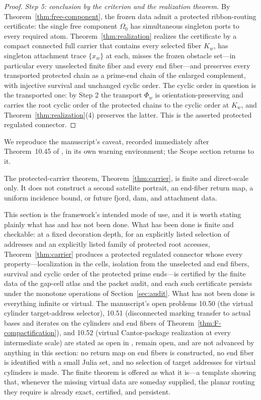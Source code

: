 \begin{proof}
\emph{Step 5: conclusion by the criterion and the realization theorem.}
By Theorem~\ref{thm:free-component}, the frozen data admit a protected
ribbon-routing certificate: the single free component $\Omega_0$ has
simultaneous singleton ports to every required atom.
Theorem~\ref{thm:realization} realizes the certificate by a compact
connected full carrier that contains every selected fiber $K_w$, has
singleton attachment trace $\{x_w\}$ at each, misses the frozen obstacle
set---in particular every unselected finite fiber and every end
fiber---and preserves every transported protected chain as a prime-end
chain of the enlarged complement, with injective survival and unchanged
cyclic order.  The cyclic order in question is the transported one: by
Step 2 the transport $\Phi_w$ is orientation-preserving and carries the
root cyclic order of the protected chains to the cyclic order at $K_w$,
and Theorem~\ref{thm:realization}(4) preserves the latter.  This is the
asserted protected regulated connector.
\end{proof}

We reproduce the manuscript's caveat, recorded immediately after
Theorem~10.45 of \cite{MWman}, in its own warning environment; the Scope
section returns to it.

\begin{warning}\label{warn:F-finite-scale}
The protected-carrier theorem, Theorem~\ref{thm:carrier}, is finite and
direct-scale only.  It does not construct a second satellite portrait, an
end-fiber return map, a uniform incidence bound, or future fjord, dam,
and attachment data.
\end{warning}

This section is the framework's intended mode of use, and it is worth
stating plainly what has and has not been done.  What has been done is
finite and checkable: at a fixed decoration depth, for an explicitly
listed selection of addresses and an explicitly listed family of
protected root accesses, Theorem~\ref{thm:carrier} produces a protected
regulated connector whose every property---localization in the cells,
isolation from the unselected and end fibers, survival and cyclic order
of the protected prime ends---is certified by the finite data of the
gap-cell atlas and the packet audit, and each such certificate persists
under the monotone operations of Section~\ref{sec:audit}.  What has not
been done is everything infinite or virtual.  The manuscript's open
problems 10.50 (the virtual cylinder target-address selector), 10.51
(disconnected marking transfer to actual bases and iterates on the
cylinders and end fibers of Theorem~\ref{thm:F-compactification}), and
10.52 (virtual Cantor-package realization at every intermediate scale)
are stated as open in \cite{MWman}, remain open, and are not advanced by
anything in this section: no return map on end fibers is constructed, no
end fiber is identified with a small Julia set, and no selection of
target addresses for virtual cylinders is made.  The finite theorem is
offered as what it is---a template showing that, whenever the missing
virtual data are someday supplied, the planar routing they require is
already exact, certified, and persistent.

